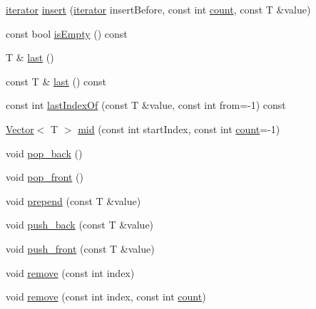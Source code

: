 \begin{DoxyCompactItemize}
\item 
\hyperlink{classprism_1_1containers_1_1_vector_a00f2237bf0922d6299f1004c0a717fd5}{iterator} \hyperlink{classprism_1_1containers_1_1_vector_a1b3b34741ace5fb8875aa4526565a35a}{insert} (\hyperlink{classprism_1_1containers_1_1_vector_a00f2237bf0922d6299f1004c0a717fd5}{iterator} insert\+Before, const int \hyperlink{classprism_1_1containers_1_1_vector_af6eed18f3336ec579c89d64819e0cb74}{count}, const T \&value)
\item 
const bool \hyperlink{classprism_1_1containers_1_1_vector_a2e4cd951704795ea090181341999ce71}{is\+Empty} () const 
\item 
T \& \hyperlink{classprism_1_1containers_1_1_vector_aabfd6351d9878945f161881f2a53a6e4}{last} ()
\item 
const T \& \hyperlink{classprism_1_1containers_1_1_vector_a154c0df950e037c9a0eafff4a1eb6bd7}{last} () const 
\item 
const int \hyperlink{classprism_1_1containers_1_1_vector_a6ca26d081aea20b16c8f8eb39e757f3f}{last\+Index\+Of} (const T \&value, const int from=-\/1) const 
\item 
\hyperlink{classprism_1_1containers_1_1_vector}{Vector}$<$ T $>$ \hyperlink{classprism_1_1containers_1_1_vector_a95d94736f6bf259e5e3d49b91398cb9d}{mid} (const int start\+Index, const int \hyperlink{classprism_1_1containers_1_1_vector_af6eed18f3336ec579c89d64819e0cb74}{count}=-\/1)
\item 
void \hyperlink{classprism_1_1containers_1_1_vector_a4d88f4bdbe0c53c54ffd19f0b5ee41ce}{pop\+\_\+back} ()
\item 
void \hyperlink{classprism_1_1containers_1_1_vector_a9b86f6528da2e86b4bab295a2d041592}{pop\+\_\+front} ()
\item 
void \hyperlink{classprism_1_1containers_1_1_vector_a0c2c626481d6511be6ee627ca2f32290}{prepend} (const T \&value)
\item 
void \hyperlink{classprism_1_1containers_1_1_vector_a3780f4bb968e34d2823916d07c887521}{push\+\_\+back} (const T \&value)
\item 
void \hyperlink{classprism_1_1containers_1_1_vector_a20918d385a82d9617d4ddfd77fef7cea}{push\+\_\+front} (const T \&value)
\item 
void \hyperlink{classprism_1_1containers_1_1_vector_a5094c70bfaf74052b9a9c3ca58efcb3e}{remove} (const int index)
\item 
void \hyperlink{classprism_1_1containers_1_1_vector_afa033b46394170c516cd0888a91c950b}{remove} (const int index, const int \hyperlink{classprism_1_1containers_1_1_vector_af6eed18f3336ec579c89d64819e0cb74}{count})

\end{DoxyCompactItemize}
